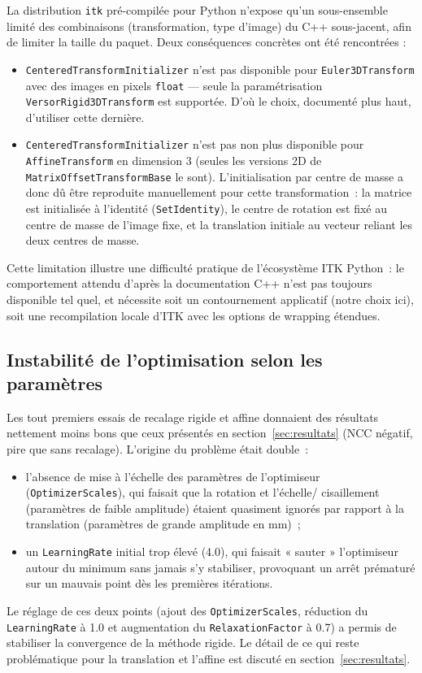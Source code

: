 \documentclass[11pt,a4paper]{article}
\begin{document}
La distribution \texttt{itk} pré-compilée pour Python n'expose qu'un
sous-ensemble limité des combinaisons (transformation, type d'image) du C++
sous-jacent, afin de limiter la taille du paquet. Deux conséquences concrètes
ont été rencontrées :

\begin{itemize}
    \item \texttt{CenteredTransformInitializer} n'est pas disponible pour
    \texttt{Euler3DTransform} avec des images en pixels \texttt{float} — seule
    la paramétrisation \texttt{VersorRigid3DTransform} est supportée. D'où le
    choix, documenté plus haut, d'utiliser cette dernière.
    \item \texttt{CenteredTransformInitializer} n'est pas non plus disponible
    pour \texttt{AffineTransform} en dimension 3 (seules les versions 2D de
    \texttt{MatrixOffsetTransformBase} le sont). L'initialisation par centre
    de masse a donc dû être reproduite manuellement pour cette transformation~:
    la matrice est initialisée à l'identité (\texttt{SetIdentity}), le centre
    de rotation est fixé au centre de masse de l'image fixe, et la translation
    initiale au vecteur reliant les deux centres de masse.
\end{itemize}

Cette limitation illustre une difficulté pratique de l'écosystème ITK Python~:
le comportement attendu d'après la documentation C++ n'est pas toujours
disponible tel quel, et nécessite soit un contournement applicatif (notre
choix ici), soit une recompilation locale d'ITK avec les options de wrapping
étendues.

\subsection{Instabilité de l'optimisation selon les paramètres}

Les tout premiers essais de recalage rigide et affine donnaient des résultats
nettement moins bons que ceux présentés en section~\ref{sec:resultats} (NCC
négatif, pire que sans recalage). L'origine du problème était double~:
\begin{itemize}
    \item l'absence de mise à l'échelle des paramètres de l'optimiseur
    (\texttt{OptimizerScales}), qui faisait que la rotation et l'échelle/
    cisaillement (paramètres de faible amplitude) étaient quasiment ignorés
    par rapport à la translation (paramètres de grande amplitude en mm)~;
    \item un \texttt{LearningRate} initial trop élevé (4.0), qui faisait
    « sauter » l'optimiseur autour du minimum sans jamais s'y stabiliser,
    provoquant un arrêt prématuré sur un mauvais point dès les premières
    itérations.
\end{itemize}
Le réglage de ces deux points (ajout des \texttt{OptimizerScales}, réduction
du \texttt{LearningRate} à 1.0 et augmentation du \texttt{RelaxationFactor} à
0.7) a permis de stabiliser la convergence de la méthode rigide. Le détail de
ce qui reste problématique pour la translation et l'affine est discuté en
section~\ref{sec:resultats}.
\end{document}
